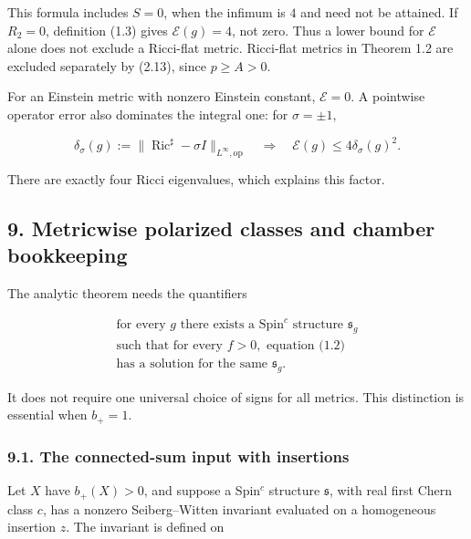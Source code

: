 \documentclass[
  10pt,
]{article}
\begin{document}
This formula includes \(S=0\), when the infimum is \(4\) and need not be
attained. If \(R_2=0\), definition (1.3) gives \(\mathcal E(g)=4\), not
zero. Thus a lower bound for \(\mathcal E\) alone does not exclude a
Ricci-flat metric. Ricci-flat metrics in Theorem 1.2 are excluded
separately by (2.13), since \(p\ge A>0\).

For an Einstein metric with nonzero Einstein constant, \(\mathcal E=0\).
A pointwise operator error also dominates the integral one: for
\(\sigma=\pm1\),

\[
 \delta_\sigma(g):=\|\operatorname{Ric}^{\sharp}-\sigma I\|_{L^\infty,\mathrm{op}}
      \quad\Longrightarrow\quad\mathcal E(g)\le4\delta_\sigma(g)^2.
 \tag{8.2}
\]

There are exactly four Ricci eigenvalues, which explains this factor.

\hypertarget{metricwise-polarized-classes-and-chamber-bookkeeping}{%
\subsection{9. Metricwise polarized classes and chamber
bookkeeping}\label{metricwise-polarized-classes-and-chamber-bookkeeping}}

The analytic theorem needs the quantifiers

\[
 \boxed{\begin{gathered}
   \text{for every }g\text{ there exists a Spin}^c
       \text{ structure }\mathfrak s_g\\
   \text{such that for every }f>0,\text{ equation (1.2)}\\
   \text{has a solution for the same }\mathfrak s_g.
 \end{gathered}}
 \tag{9.1}
\]

It does not require one universal choice of signs for all metrics. This
distinction is essential when \(b_+=1\).

\hypertarget{the-connected-sum-input-with-insertions}{%
\subsubsection{9.1. The connected-sum input with
insertions}\label{the-connected-sum-input-with-insertions}}

Let \(X\) have \(b_+(X)>0\), and suppose a Spin\(^c\) structure
\(\mathfrak s\), with real first Chern class \(c\), has a nonzero
Seiberg--Witten invariant evaluated on a homogeneous insertion \(z\).
The invariant is defined on
\end{document}
